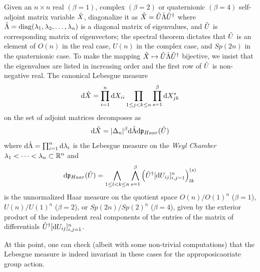 \begin{proposicao}
	Given an $n\times n$ real $(\beta = 1)$, complex $(\beta = 2)$ or quaternionic $(\beta = 4)$ self-adjoint matrix variable $\hat X$, diagonalize it as $\hat X = \hat U \hat\Lambda \hat U^{\dagger}$ where $\hat\Lambda = \operatorname{diag}(\lambda_1, \lambda_2, \dots, \lambda_n)$ is a diagonal matrix of eigenvalues, and $\hat U$ is corresponding matrix of eigenvectors; the spectral theorem dictates that $\hat U$ is an element of $O(n)$ in the real case, $U(n)$ in the complex case, and $Sp(2n)$ in the quaternionic case. To make the mapping $\hat X \mapsto \hat U\hat\Lambda\hat U^{\dagger}$ bijective, we insist that the eigenvalues are listed in increasing order and the first row of $\hat U$ is non-negative real. The canonical Lebesgue measure 
	\begin{equation}
		\mathrm{d} \hat X = \prod_{i=1}^{n} \mathrm{d} X_{ii} \prod_{1\leq j < k \leq n} \prod_{s=1}^{\beta} \mathrm{d} X^{s}_{jk}
	\end{equation}
	on the set of adjoint matrices decomposes as 
	\begin{equation}
		\mathrm{d} \hat X = |\Delta_n|^{\beta} \mathrm{d} \hat\Lambda \mathrm{d} \mathfrak{p}_{Haar}(\hat U)
	\end{equation}
	where $\mathrm{d} \hat\Lambda = \prod_{i=1}^n \mathrm{d} \lambda_i$ is the Lebesgue measure on the \textit{Weyl Chamber} ${\lambda_1 < \cdots < \lambda_n} \subset \mathbb{R}^n$ and
	\begin{equation}
		\mathrm{d} \mathfrak{p}_{Haar}(\hat U) = \bigwedge_{1\leq l < k \leq n} \bigwedge_{s=1}^\beta \left( \hat U^{\dagger} [\mathrm{d} U_{ij}]_{i,j=1}^n \right)_{lk}^{(s)}
	\end{equation}
	is the unnormalized Haar measure on the quotient space $O(n)/O(1)^n$ ($\beta = 1$), $U(n)/U(1)^n$ ($\beta = 2$), or $Sp(2n)/Sp(2)^n$ ($\beta = 4$), given by the exterior product of the independent real components of the entries of the matrix of differentials $\hat U^{\dagger} [\mathrm{d} U_{ij}]_{i,j=1}^n$.
\end{proposicao}

At this point, one can check (albeit with some non-trivial computations) that the Lebesgue measure is indeed invariant in these cases for the approposicaoriate group action. 

